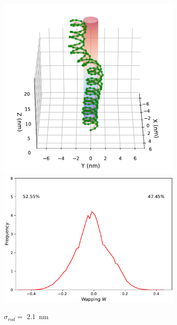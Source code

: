 \documentclass[a4paper,10pt]{article}
\begin{document}
\begin{figure}[tb]
\centering
\begin{subfigure}{.3\textwidth}
\includegraphics[width=\textwidth]{r2_A_2000000_16.pdf}
\includegraphics[width=\textwidth]{r2_A_wr_pr.pdf}
\caption{$\sigma_{rod}=$ \SI{2.1}{\nm}}
\label{fig:r2_a}
\end{subfigure}
\begin{subfigure}{.3\textwidth}

\end{subfigure}
\end{figure}
\end{document}
